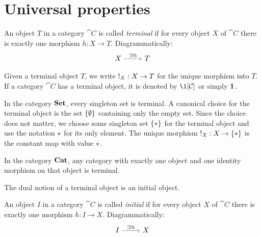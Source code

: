 \section{Universal properties}

\begin{defn} \label{def:terminal-object}
An object $T$ in a category $\cat{C}$ is called \emph{terminal} if for every object $X$ of $\cat{C}$ there is exactly one morphism $h : X \to T$. Diagrammatically:
\[\begin{tikzcd}
	X & T
	\arrow["{\exists! h}", dashed, from=1-1, to=1-2]
\end{tikzcd}\]
\end{defn}

Given a terminal object $T$, we write $\mterm[X] : X \to T$ for the unique morphism into $T$. If a category $\cat{C}$ has a terminal object, it is denoted by $\1[\cat{C}]$ or simply $\1$.

\begin{ex} \label{ex:set-terminal-object}
In the category $\Set$, every singleton set is terminal. A canonical choice for the terminal object is the set $\singset[\nul]$ containing only the empty set. Since the choice does not matter, we choose some singleton set $\singset$ for the terminal object and use the notation $\singel$ for its only element. The unique morphism $\mterm[X] : X \to \singset$ is the constant map with value $\singel$.
\end{ex}

\begin{ex}
In the category $\Cat$, any category with exactly one object and one identity morphism on that object is terminal.
\end{ex}

The dual notion of a terminal object is an initial object.

\begin{defn} \label{def:initial-object}
An object $I$ in a category $\cat{C}$ is called \emph{initial} if for every object $X$ of $\cat{C}$ there is exactly one morphism $h : I \to X$. Diagrammatically:
\[\begin{tikzcd}
	I & X
	\arrow["{\exists! h}", dashed, from=1-1, to=1-2]
\end{tikzcd}\]
\end{defn}

